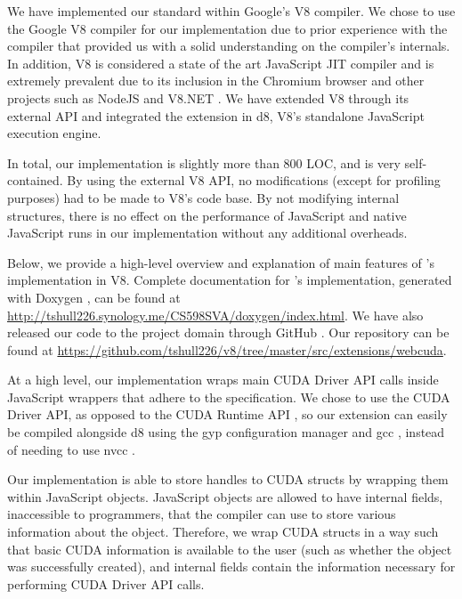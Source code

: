 
We have implemented our \name standard within Google's V8 \cite{V8website}
compiler.   We chose to use the Google V8  compiler for our implementation due
to prior experience with the compiler that provided us with a solid
understanding on the compiler's internals. In addition, V8 is considered a state
of the art JavaScript JIT compiler and is extremely prevalent due to its
inclusion in the Chromium browser \cite{chromium} and other projects such as
NodeJS \cite{nodeJS} and V8.NET \cite{V8.NET}. We have extended V8 through its
external API and integrated the extension in d8, V8's standalone JavaScript
execution engine. 

In total, our implementation is slightly more than 800 LOC, and is very
self-contained. By using the external V8 API, no modifications (except for
profiling purposes) had to be made to V8's code base. By not modifying internal
structures, there is no effect on the performance of JavaScript and native
JavaScript runs in our implementation without any additional overheads.

Below, we provide a high-level overview and explanation of main features of
\namens's implementation in V8.  Complete documentation for \namens's implementation,
generated with Doxygen \cite{doxygen}, can be found at
\url{http://tshull226.synology.me/CS598SVA/doxygen/index.html}. We
have also released our code to the project domain through GitHub \cite{github}.
Our repository can be found at
\url{https://github.com/tshull226/v8/tree/master/src/extensions/webcuda}.

At a high level, our implementation wraps main CUDA Driver API \cite{cudaAPI}
calls inside JavaScript wrappers that adhere to the \name specification. We
chose to use the CUDA Driver API, as opposed to the CUDA Runtime API
\cite{cudaRuntimeAPI}, so our extension can easily be compiled alongside d8
using the gyp \cite{gyp} configuration manager and gcc \cite{gcc}, instead of
needing to use nvcc \cite{nvcc}.

Our implementation is able to store handles to CUDA structs by wrapping them
within JavaScript objects. JavaScript objects are allowed to have internal
fields, inaccessible to programmers, that the compiler can use to store various
information about the object. Therefore, we wrap CUDA structs in a way such that
basic CUDA information is available to the user (such as whether the object was
successfully created), and internal fields contain the information
necessary for performing CUDA Driver API calls.

